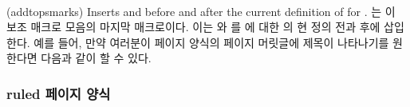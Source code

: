 \begin{syntax}
\cmd{\addtopsmarks} \\
\end{syntax}
\glossary(addtopsmarks)%
  {}%
  {Inserts  and  before and after the current
   definition of  for .}
\cmd{\addtopsmarks}는 이 보조 매크로
모음의 마지막 매크로이다.
이는 와 를 에 대한
의 현 정의 전과 후에 삽입한다.
예를 들어, 만약 여러분이  페이지 양식의 페이지 머릿글에
 제목이 나타나기를 원한다면 다음과 같이 할 수 있다.
\begin{lcode}
\end{lcode}


\subsubsection{ruled 페이지 양식}

